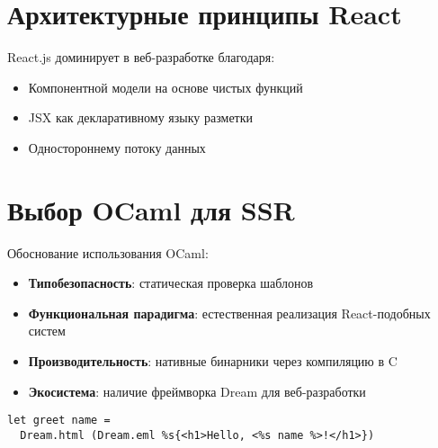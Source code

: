\section{Архитектурные принципы React}
React.js доминирует в веб-разработке благодаря:
\begin{itemize}
    \item Компонентной модели на основе чистых функций
    \item JSX как декларативному языку разметки
    \item Одностороннему потоку данных
\end{itemize}

\section{Выбор OCaml для SSR}
Обоснование использования OCaml:
\begin{itemize}
    \item \textbf{Типобезопасность}: статическая проверка шаблонов
    \item \textbf{Функциональная парадигма}: естественная реализация React-подобных систем
    \item \textbf{Производительность}: нативные бинарники через компиляцию в C
    \item \textbf{Экосистема}: наличие фреймворка Dream для веб-разработки
\end{itemize}

\begin{lstlisting}[caption=Пример компонента на OCaml]
let greet name = 
  Dream.html (Dream.eml %s{<h1>Hello, <%s name %>!</h1>})
\end{lstlisting}